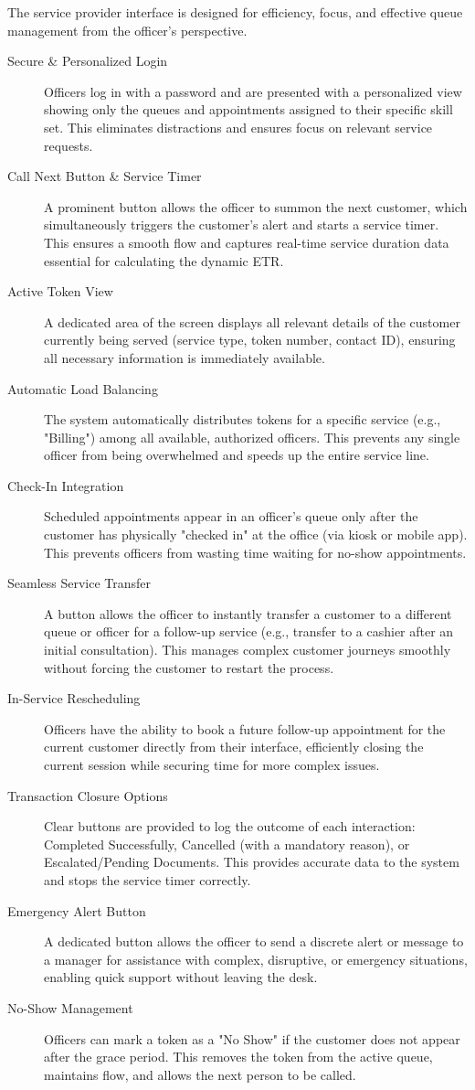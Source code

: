 \documentclass{article}
\begin{document}
The service provider interface is designed for efficiency, focus, and effective queue management from the officer's perspective.

\begin{description}
    \item[Secure & Personalized Login] Officers log in with a password and are presented with a personalized view showing only the queues and appointments assigned to their specific skill set. This eliminates distractions and ensures focus on relevant service requests.
    \item[Call Next Button & Service Timer] A prominent button allows the officer to summon the next customer, which simultaneously triggers the customer's alert and starts a service timer. This ensures a smooth flow and captures real-time service duration data essential for calculating the dynamic ETR.
    \item[Active Token View] A dedicated area of the screen displays all relevant details of the customer currently being served (service type, token number, contact ID), ensuring all necessary information is immediately available.
    \item[Automatic Load Balancing] The system automatically distributes tokens for a specific service (e.g., "Billing") among all available, authorized officers. This prevents any single officer from being overwhelmed and speeds up the entire service line.
    \item[Check-In Integration] Scheduled appointments appear in an officer's queue only after the customer has physically "checked in" at the office (via kiosk or mobile app). This prevents officers from wasting time waiting for no-show appointments.
    \item[Seamless Service Transfer] A button allows the officer to instantly transfer a customer to a different queue or officer for a follow-up service (e.g., transfer to a cashier after an initial consultation). This manages complex customer journeys smoothly without forcing the customer to restart the process.
    \item[In-Service Rescheduling] Officers have the ability to book a future follow-up appointment for the current customer directly from their interface, efficiently closing the current session while securing time for more complex issues.
    \item[Transaction Closure Options] Clear buttons are provided to log the outcome of each interaction: Completed Successfully, Cancelled (with a mandatory reason), or Escalated/Pending Documents. This provides accurate data to the system and stops the service timer correctly.
    \item[Emergency Alert Button] A dedicated button allows the officer to send a discrete alert or message to a manager for assistance with complex, disruptive, or emergency situations, enabling quick support without leaving the desk.
    \item[No-Show Management] Officers can mark a token as a "No Show" if the customer does not appear after the grace period. This removes the token from the active queue, maintains flow, and allows the next person to be called.
\end{description}
\end{document}
